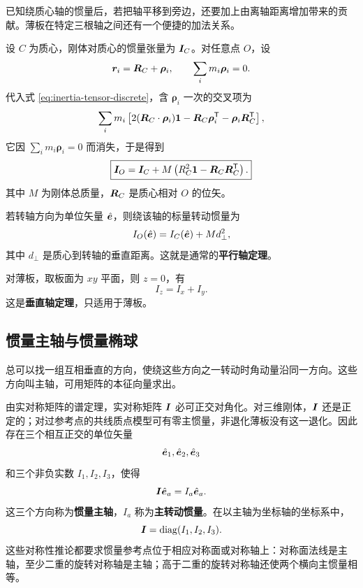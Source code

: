 已知绕质心轴的惯量后，若把轴平移到旁边，还要加上由离轴距离增加带来的贡献。薄板在特定三根轴之间还有一个便捷的加法关系。

设 \(C\) 为质心，刚体对质心的惯量张量为 \(\boldsymbol{I}_C\)。对任意点 \(O\)，设
\[
\boldsymbol{r}_i=\boldsymbol{R}_C+\boldsymbol\rho_i,
\qquad
\sum_i m_i\boldsymbol\rho_i=0.
\]
代入式 \eqref{eq:inertia-tensor-discrete}，含 \(\boldsymbol\rho_i\) 一次的交叉项为
\[
\sum_i m_i\left[
2(\boldsymbol{R}_C\cdot\boldsymbol\rho_i)\mathbf 1
-\boldsymbol{R}_C\boldsymbol\rho_i^{\mathsf T}
-\boldsymbol\rho_i\boldsymbol{R}_C^{\mathsf T}\right],
\]
它因 \(\sum_i m_i\boldsymbol\rho_i=0\) 而消失，于是得到
\begin{equation}
\boxed{
\boldsymbol{I}_O=\boldsymbol{I}_C+M\left(R_C^2\mathbf 1-\boldsymbol{R}_C\boldsymbol{R}_C^{\mathsf T}\right).
}
\label{eq:parallel-axis-tensor}
\end{equation}
其中 \(M\) 为刚体总质量，\(\boldsymbol{R}_C\) 是质心相对 \(O\) 的位矢。

若转轴方向为单位矢量 \(\hat{\boldsymbol{e}}\)，则绕该轴的标量转动惯量为
\begin{equation}
I_O(\hat{\boldsymbol{e}})=I_C(\hat{\boldsymbol{e}})+M d_\perp^2,
\label{eq:parallel-axis-scalar}
\end{equation}
其中 \(d_\perp\) 是质心到转轴的垂直距离。这就是通常的\textbf{平行轴定理}。

对薄板，取板面为 \(xy\) 平面，则 \(z=0\)，有
\begin{equation}
I_z=I_x+I_y.
\label{eq:perpendicular-axis}
\end{equation}
这是\textbf{垂直轴定理}，只适用于薄板。

\subsection{惯量主轴与惯量椭球}

总可以找一组互相垂直的方向，使绕这些方向之一转动时角动量沿同一方向。这些方向叫主轴，可用矩阵的本征向量求出。

由实对称矩阵的谱定理，实对称矩阵 \(\boldsymbol{I}\) 必可正交对角化。对三维刚体，\(\boldsymbol{I}\) 还是正定的；对过参考点的共线质点模型可有零主惯量，非退化薄板没有这一退化。因此存在三个相互正交的单位矢量
\[
\hat{\boldsymbol{e}}_1,\hat{\boldsymbol{e}}_2,\hat{\boldsymbol{e}}_3
\]
和三个非负实数 \(I_1,I_2,I_3\)，使得
\begin{equation}
\boldsymbol{I}\hat{\boldsymbol{e}}_a=I_a\hat{\boldsymbol{e}}_a.
\label{eq:principal-axis-eq}
\end{equation}
这三个方向称为\textbf{惯量主轴}，\(I_a\) 称为\textbf{主转动惯量}。在以主轴为坐标轴的坐标系中，
\begin{equation}
\boldsymbol{I}=\operatorname{diag}(I_1,I_2,I_3).
\label{eq:principal-inertia}
\end{equation}
这些对称性推论都要求惯量参考点位于相应对称面或对称轴上：对称面法线是主轴，至少二重的旋转对称轴是主轴；高于二重的旋转对称轴还使两个横向主惯量相等。


